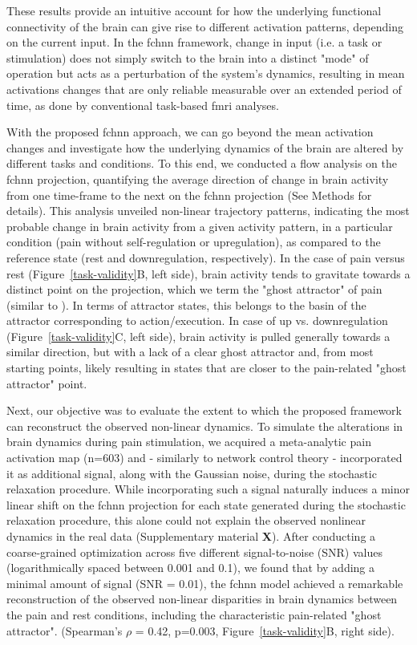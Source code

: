 \documentclass{article}
\begin{document}
These results provide an intuitive account for how the underlying functional connectivity of the brain can give rise to different activation patterns, depending on the current input. In the \acrshort{fchnn} framework, change in input (i.e. a task or stimulation) does not simply switch to the brain into a distinct "mode" of operation but acts as
a perturbation of the system's dynamics, resulting in mean activations changes that are only reliable measurable over an extended period of time, as done by conventional task-based \acrshort{fmri} analyses.

With the proposed \acrshort{fchnn} approach, we can go beyond the mean activation changes and investigate how the underlying dynamics of the brain are altered by different tasks and conditions. To this end, we conducted a flow analysis on the \acrshort{fchnn} projection, quantifying the average direction of change in brain activity from one time-frame to the next on the \acrshort{fchnn} projection (See Methods for details).
This analysis unveiled non-linear trajectory patterns, indicating the most probable change in brain activity from a given activity pattern, in a particular condition (pain without self-regulation or upregulation), as
compared to the reference state (rest and downregulation, respectively). In the case of pain versus rest (Figure~\ref{task-validity}B, left side), brain activity tends to gravitate towards a distinct point on the projection, which we term the "ghost attractor" of pain (similar to \cite{vohryzek2020ghost}). In terms of attractor states, this belongs to the basin of the attractor corresponding to action/execution. In case of up vs. downregulation (Figure~\ref{task-validity}C, left side), brain activity is pulled generally towards a similar direction, but with a lack of a clear ghost attractor and, from most starting points, likely resulting in states that are closer to the pain-related "ghost attractor" point.

Next, our objective was to evaluate the extent to which the proposed framework can reconstruct the observed non-linear dynamics. To simulate the alterations in brain dynamics during pain stimulation, we acquired a meta-analytic pain activation map \citep{zunhammer2021meta} (n=603) and - similarly to network control theory \citep{gu2015controllability}- incorporated it as additional signal, along with the Gaussian noise,
during the stochastic relaxation procedure. While incorporating such a signal naturally induces a minor linear shift on the \acrshort{fchnn} projection for each state generated during the stochastic relaxation procedure, this alone could not explain the observed nonlinear dynamics in the real data (Supplementary material \textbf{X}). After conducting a
coarse-grained optimization across five different signal-to-noise (SNR) values (logarithmically spaced between
0.001 and 0.1), we found that by adding a minimal amount of signal (SNR = 0.01), the \acrshort{fchnn} model achieved a remarkable reconstruction of the observed non-linear disparities in brain dynamics between the pain and rest conditions, including the characteristic pain-related "ghost attractor". (Spearman's $\rho$ = 0.42, p=0.003,
Figure~\ref{task-validity}B, right side).
\end{document}
